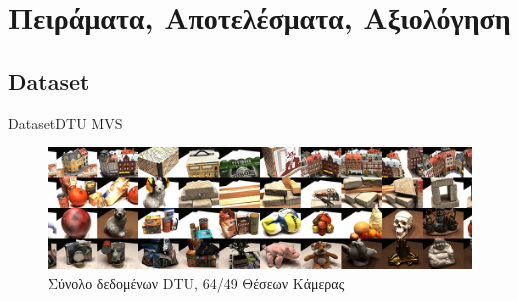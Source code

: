 \documentclass[10pt]{beamer}
\begin{document}
\section{Πειράματα, Αποτελέσματα, Αξιολόγηση}
\subsection{Dataset}
\begin{frame}{Dataset}{DTU MVS}
    \begin{figure}
        \centering
        \includegraphics[width=\textwidth]{images/dtu.jpg}
        \caption{Σύνολο δεδομένων DTU, 64/49 Θέσεων Κάμερας}
        \label{fig:enter-label}
    \end{figure}
\end{frame}
\end{document}
